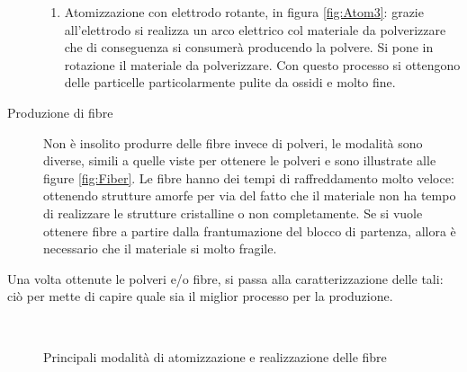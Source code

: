 \begin{description}
\begin{enumerate}
	\item Atomizzazione con elettrodo rotante, in figura \ref{fig:Atom3}: grazie all'elettrodo si realizza un arco elettrico col materiale da polverizzare che di conseguenza si consumerà producendo la polvere. Si pone in rotazione il materiale da polverizzare. Con questo processo si ottengono delle particelle particolarmente pulite da ossidi e molto fine.
	\end{enumerate}
\item[Produzione di fibre] Non è insolito produrre delle fibre invece di polveri, le modalità sono diverse, simili a quelle viste per ottenere le polveri e sono illustrate alle figure \ref{fig:Fiber}. Le fibre hanno dei tempi di raffreddamento molto veloce: ottenendo strutture amorfe per via del fatto che il materiale non ha tempo di realizzare le strutture cristalline o non completamente.
Se si vuole ottenere fibre a partire dalla frantumazione del blocco di partenza, allora è necessario che il materiale si molto fragile.
\end{description}

Una volta ottenute le polveri e/o fibre, si passa alla caratterizzazione delle tali: ciò per mette di capire quale sia il miglior processo per la produzione.

\begin{figure}
\centering
{}\:
\:
\\
\:
\:
\caption{Principali modalità di atomizzazione e realizzazione delle fibre}
\label{fig:Atom}
\end{figure}

